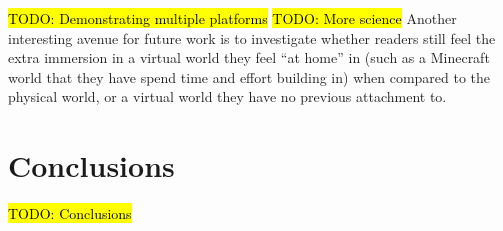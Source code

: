 \documentclass{acm}
\newcommand{\TODO}[1]{\hl{TODO: #1}}
\begin{document}
\TODO{Demonstrating multiple platforms}
\TODO{More science}
Another interesting avenue for future work is to investigate whether readers still feel the extra immersion in a virtual world they feel ``at home'' in (such as a Minecraft world that they have spend time and effort building in) when compared to the physical world, or a virtual world they have no previous attachment to.

\section{Conclusions}
\TODO{Conclusions}



\end{document}
